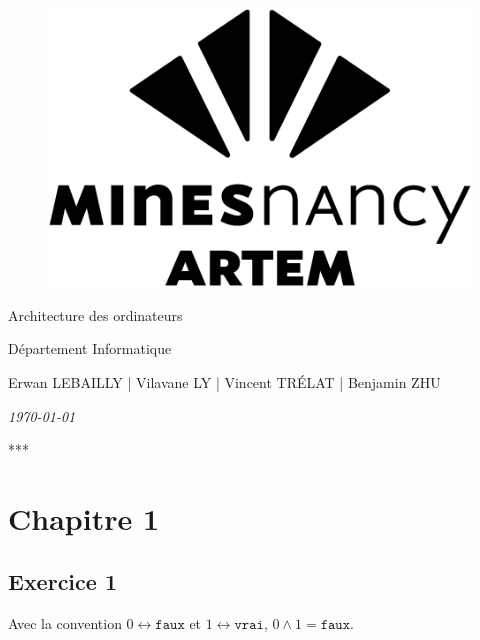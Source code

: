 \documentclass[11pt, a4 paper]{article}
\begin{document}
\begin{titlepage}
    \begin{figure}[!h]
        \centering
        \includegraphics[height = .2\textwidth]{img/logoartem.png}
    \end{figure}
    \vspace{3cm}

    \begin{center}
        \huge{Architecture des ordinateurs}
    \end{center}
    \vspace{1cm}
    \begin{center}
        \large{Département Informatique}
    \end{center}
    \vspace{1 cm}
    \begin{center}
        Erwan LEBAILLY | Vilavane LY | Vincent TRÉLAT | Benjamin ZHU
    \end{center}
    \vspace{2 cm}
    \begin{center}
        \textit{\today}
    \end{center}
    \vspace{2 cm}
    \begin{center}
        ***
    \end{center}
    
\end{titlepage}
\tableofcontents
\pagebreak

\section{Chapitre 1}
\subsection{Exercice 1}
Avec la convention $0 \leftrightarrow \texttt{faux}$ et $1 \leftrightarrow \texttt{vrai}$, $0 \wedge 1 = \texttt{faux}$.
\end{document}
